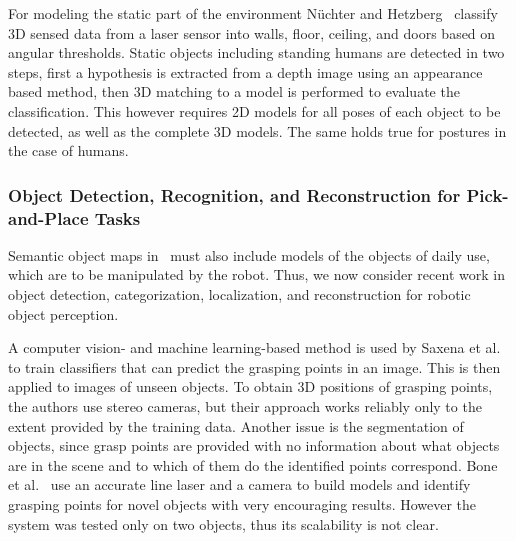 
For modeling the static part of the environment N\"uchter and
Hetzberg~\cite{nuechter08semanticmaps} classify 3D sensed data from a
laser sensor into walls, floor, ceiling, and doors based on angular
thresholds. Static objects including standing humans are detected
in two steps, first a hypothesis is extracted from a depth image
using an appearance based method, then 3D matching to a model is
performed to evaluate the classification. This however requires 2D
models for all poses of each object to be detected, as well as the
complete 3D models. The same holds true for postures in the case of humans.\\
\subsubsection{Object Detection, Recognition, and Reconstruction for Pick-and-Place Tasks}
\label{sec:objects}
Semantic object maps in \ksem\ must also include models of the objects of daily use, which
are to be manipulated by the robot. Thus, we now consider recent
work in object detection, categorization, localization, and
reconstruction for robotic object perception.



A computer vision- and machine learning-based method is used by Saxena
et al.~\cite{Saxena08Grasping} to train classifiers that can predict
the grasping points in an image.  This is then applied to images of
unseen objects.  To obtain 3D positions of grasping points, the
authors use stereo cameras, but their approach works reliably only to
the extent provided by the training data.  Another issue is the
segmentation of objects, since grasp points are provided with no
information about what objects are in the scene and to which of them
do the identified points correspond.  Bone et
al.~\cite{Lambert08Grasping} use an accurate line laser and a camera
to build models and identify grasping points for novel objects with
very encouraging results.  However the system was tested only on two
objects, thus its scalability is not clear.

